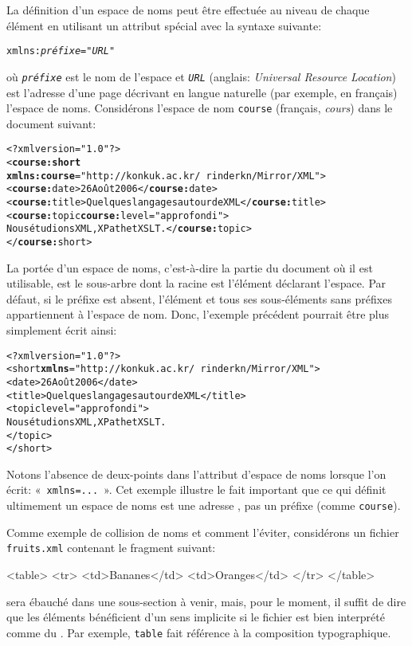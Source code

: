 La définition d'un espace de noms peut être effectuée au niveau de
chaque élément en utilisant un attribut spécial avec la syntaxe
suivante:
\begin{alltt}
\small{}xmlns:\textit{préfixe} = "\textit{URL}"
\end{alltt}
où \texttt{\emph{préfixe}} est le nom de l'espace et
\texttt{\emph{URL}} (anglais: \emph{Universal Resource Location}) est
l'adresse \HTTP d'une page \HTML décrivant en langue naturelle (par
exemple, en français) l'espace de noms. Considérons l'espace de nom
\texttt{course} (français, \emph{cours}) dans le document suivant:
\begin{alltt}
\small<?xml version="1.0"?>
<\textbf{course:short}
  \textbf{xmlns:course}="http://konkuk.ac.kr/~rinderkn/Mirror/XML">
 <\textbf{course:}date>26 Août 2006</\textbf{course:}date>
 <\textbf{course:}title>Quelques langages autour de XML</\textbf{course:}title>
 <\textbf{course:}topic \textbf{course:}level="approfondi">
   Nous étudions XML, XPath et XSLT.</\textbf{course:}topic>
</\textbf{course:}short>
\end{alltt}
La portée d'un espace de noms, c'est-à-dire la partie du document où
il est utilisable, est le sous-arbre dont la racine est l'élément
déclarant l'espace. Par défaut, si le préfixe est absent, l'élément et
tous ses sous-éléments sans préfixes appartiennent à l'espace de
nom. Donc, l'exemple précédent pourrait être plus simplement écrit ainsi:
\begin{alltt}
\small<?xml version="1.0"?>
<short \textbf{xmlns}="http://konkuk.ac.kr/~rinderkn/Mirror/XML">
 <date>26 Août 2006</date>
 <title>Quelques langages autour de XML</title>
 <topic level="approfondi">
   Nous étudions XML, XPath et XSLT.
 </topic>
</short>
\end{alltt}
Notons l'absence de deux-points dans l'attribut d'espace de noms
lorsque l'on écrit: «~\texttt{xmlns=...}~». Cet exemple illustre le fait
important que ce qui définit ultimement un espace de noms est une
adresse \HTTP, pas un préfixe (comme \texttt{course}).

Comme exemple de collision de noms et comment l'éviter, considérons un
fichier \texttt{fruits.xml} contenant le fragment \HTML suivant:
\begin{sverb}
<table>
  <tr>
    <td>Bananes</td>
    <td>Oranges</td>
  </tr>
</table>
\end{sverb}
\HTML sera ébauché dans une sous-section à venir, mais, pour le
moment, il suffit de dire que les éléments bénéficient d'un sens
implicite si le fichier est bien interprété comme du \HTML. Par
exemple, \texttt{table} fait référence à la composition typographique.

